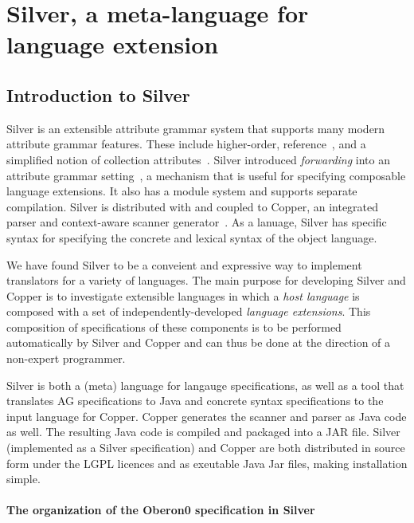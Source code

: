 \newpage
\newcommand{\code}[1]{\texttt{#1}}

\section{Silver, a meta-language for language extension}

\subsection{Introduction to Silver}

Silver is an extensible attribute grammar system that
supports many modern attribute grammar features.  These include
higher-order\cite{vogt89}, reference~\cite{hedin00informatica}, and a
simplified notion of collection attributes~\cite{boyland05}.
%
Silver introduced \emph{forwarding} into an attribute grammar
setting~\cite{vanwyk02}, a mechanism that is useful for specifying
composable language extensions.
%
It also has a module system and supports separate compilation.
%
Silver is distributed with and coupled to Copper, an integrated parser
and context-aware scanner generator~\cite{vanwyk07gpce}.  As a
lanuage, Silver has specific syntax for specifying the concrete and
lexical syntax of the object language.

We have found Silver to be a conveient and expressive way to implement
translators for a variety of languages.  The main purpose for
developing Silver and Copper is to investigate extensible languages in
which a \emph{host language} is composed with a set of
independently-developed \emph{language extensions}.  This composition
of specifications of these components is to be performed automatically
by Silver and Copper and can thus be done at the direction of a
non-expert programmer.

Silver is both a (meta) language for langauge specifications, as well
as a tool that translates AG specifications to Java and concrete
syntax specifications to the input language for Copper.  Copper
generates the scanner and parser as Java code as well.  The resulting
Java code is compiled and packaged into a JAR file.  Silver
(implemented as a Silver specification) and Copper are both
distributed in source form under the LGPL licences and as exeutable
Java Jar files, making installation simple.


\paragraph{The organization of the Oberon0 specification in Silver}

